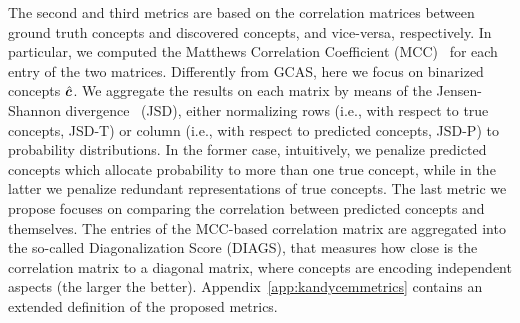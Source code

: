 The second and third metrics are based on the correlation matrices between ground truth concepts and discovered concepts, and vice-versa, respectively. In particular, we computed the {\sc\small Matthews Correlation Coefficient} ({\sc\small MCC})~\cite{matthews1975comparison} for each entry of the two matrices. Differently from {\small\sc GCAS}, here we focus on binarized concepts $\hat{{\bm{c}}}$. We aggregate the results on each matrix by means of the  {\sc\small Jensen-Shannon divergence}~\cite{menendez1997jensen} ({\small\sc JSD}), either normalizing rows (i.e., with respect to true concepts, {\small\sc JSD-T}) or column (i.e., with respect to predicted concepts, {\small\sc JSD-P}) to probability distributions. %
In the former case, intuitively, we penalize predicted concepts which allocate probability to more than one true concept, while in the latter we penalize redundant representations of true concepts.
The last metric we propose focuses on comparing the correlation between predicted concepts and themselves. The entries of the {\sc\small MCC}-based correlation matrix are aggregated into the so-called {\small\sc Diagonalization Score} ({\small\sc DIAGS}), that measures how close is the correlation matrix to a diagonal matrix, where concepts are encoding independent aspects (the larger the better).
Appendix~\ref{app:kandycemmetrics} contains an extended definition of the proposed metrics.
